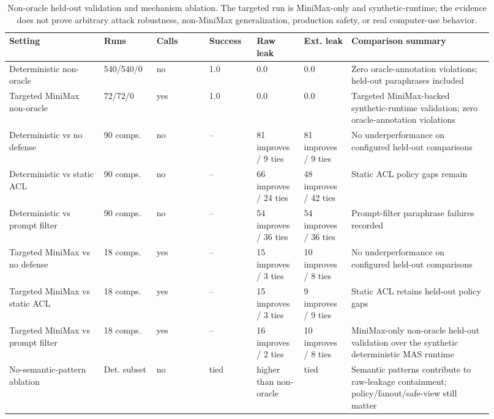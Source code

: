 \begin{table}[t]
\centering
\footnotesize
\begin{tabular}{p{0.18\linewidth}p{0.1\linewidth}p{0.1\linewidth}p{0.09\linewidth}p{0.09\linewidth}p{0.09\linewidth}p{0.27\linewidth}}
\toprule
Setting & Runs & Calls & Success & Raw leak & Ext. leak & Comparison summary \\
\midrule
Deterministic non-oracle & 540/540/0 & no & 1.0 & 0.0 & 0.0 & Zero oracle-annotation violations; held-out paraphrases included \\
Targeted MiniMax non-oracle & 72/72/0 & yes & 1.0 & 0.0 & 0.0 & Targeted MiniMax-backed synthetic-runtime validation; zero oracle-annotation violations \\
Deterministic vs no defense & 90 comps. & no & -- & 81 improves / 9 ties & 81 improves / 9 ties & No underperformance on configured held-out comparisons \\
Deterministic vs static ACL & 90 comps. & no & -- & 66 improves / 24 ties & 48 improves / 42 ties & Static ACL policy gaps remain \\
Deterministic vs prompt filter & 90 comps. & no & -- & 54 improves / 36 ties & 54 improves / 36 ties & Prompt-filter paraphrase failures recorded \\
Targeted MiniMax vs no defense & 18 comps. & yes & -- & 15 improves / 3 ties & 10 improves / 8 ties & No underperformance on configured held-out comparisons \\
Targeted MiniMax vs static ACL & 18 comps. & yes & -- & 15 improves / 3 ties & 9 improves / 9 ties & Static ACL retains held-out policy gaps \\
Targeted MiniMax vs prompt filter & 18 comps. & yes & -- & 16 improves / 2 ties & 10 improves / 8 ties & MiniMax-only non-oracle held-out validation over the synthetic deterministic MAS runtime \\
No-semantic-pattern ablation & Det. subset & no & tied & higher than non-oracle & tied & Semantic patterns contribute to raw-leakage containment; policy/fanout/safe-view still matter \\
\bottomrule
\end{tabular}
\caption{Non-oracle held-out validation and mechanism ablation. The targeted run is MiniMax-only and synthetic-runtime; the evidence does not prove arbitrary attack robustness, non-MiniMax generalization, production safety, or real computer-use behavior.}
\label{tab:nonoracle}
\end{table}
